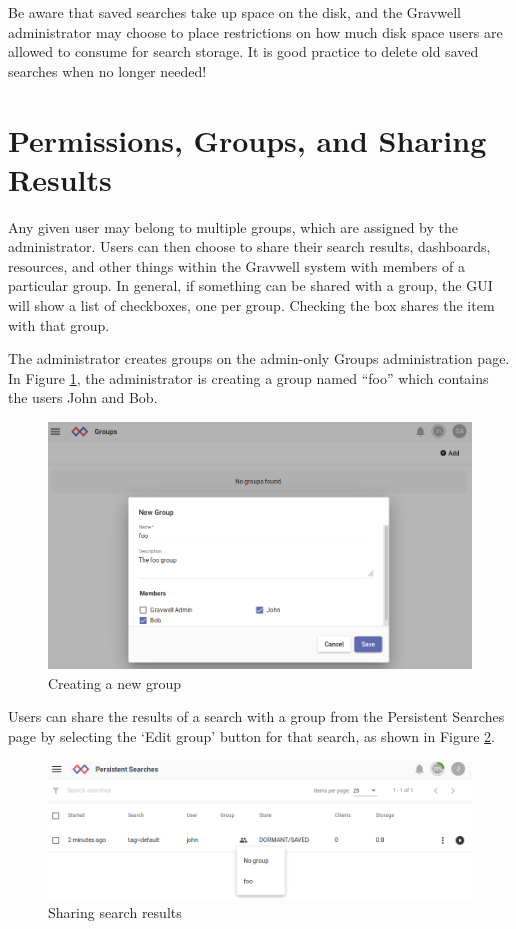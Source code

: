 Be aware that saved searches take up space on the disk, and the
Gravwell administrator may choose to place restrictions on how much disk
space users are allowed to consume for search storage. It is good
practice to delete old saved searches when no longer needed!


\section{Permissions, Groups, and Sharing Results}

Any given user may belong to multiple groups, which are assigned by the
administrator. Users can then choose to share their search results,
dashboards, resources, and other things within the Gravwell system with
members of a particular group. In general, if something can be shared
with a group, the GUI will show a list of checkboxes, one per group.
Checking the box shares the item with that group.

The administrator creates groups on the admin-only Groups
administration page. In Figure \ref{fig:newgroup-foo}, the administrator is
creating a group named ``foo'' which contains the users John and Bob.

\begin{figure}
	\includegraphics{images/newgroup-foo.png}
	\caption{Creating a new group}
	\label{fig:newgroup-foo}
\end{figure}

{}

Users can share the results of a search with a group from the
Persistent Searches page by selecting the `Edit group' button for that
search, as shown in Figure \ref{fig:share-search}.

\begin{figure}
	\includegraphics{images/share-search.png}
	\caption{Sharing search results}
	\label{fig:share-search}
\end{figure}

